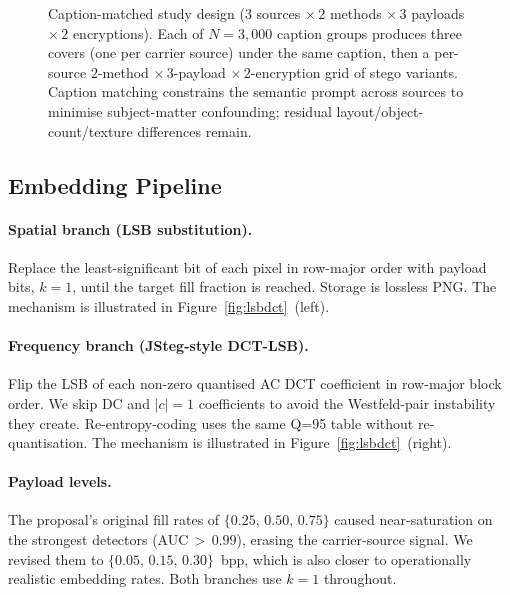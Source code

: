 \documentclass[10pt,twocolumn,a4paper]{article}
\begin{document}
\begin{figure}[t]
\caption{Caption-matched study design ($3$ sources $\times\,2$ methods $\times\,3$ payloads $\times\,2$ encryptions). Each of $N\!=\!3{,}000$ caption groups produces three covers (one per carrier source) under the same caption, then a per-source $2$-method $\times\,3$-payload $\times\,2$-encryption grid of stego variants. Caption matching constrains the semantic prompt across sources to minimise subject-matter confounding; residual layout/object-count/texture differences remain.}
\label{fig:factorial}
\end{figure}

\subsection{Embedding Pipeline}
\label{sec:embedding}

\paragraph{Spatial branch (LSB substitution).} Replace the least-significant bit of each pixel in row-major order with payload bits, $k\!=\!1$, until the target fill fraction is reached. Storage is lossless PNG. The mechanism is illustrated in Figure~\ref{fig:lsbdct}~(left).

\paragraph{Frequency branch (JSteg-style DCT-LSB).} Flip the LSB of each non-zero quantised AC DCT coefficient in row-major block order. We skip DC and $|c|\!=\!1$ coefficients to avoid the Westfeld-pair instability they create. Re-entropy-coding uses the same Q=95 table without re-quantisation. The mechanism is illustrated in Figure~\ref{fig:lsbdct}~(right).

\paragraph{Payload levels.} The proposal's original fill rates of $\{0.25,\,0.50,\,0.75\}$ caused near-saturation on the strongest detectors (AUC$\,>\,0.99$), erasing the carrier-source signal. We revised them to $\{0.05,\,0.15,\,0.30\}$~bpp, which is also closer to operationally realistic embedding rates. Both branches use $k\!=\!1$ throughout.
\end{document}
